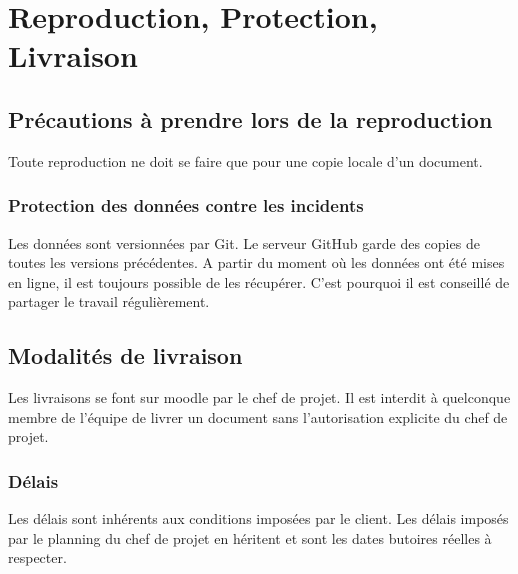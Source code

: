 \section{Reproduction, Protection, Livraison}

\subsection{Précautions à prendre lors de la reproduction}
Toute reproduction ne doit se faire que pour une copie locale d'un document.

\subsubsection{Protection des données contre les incidents}
Les données sont versionnées par Git. Le serveur GitHub garde des copies de toutes les versions précédentes.
A partir du moment où les données ont été mises en ligne, il est toujours possible de les récupérer.
C'est pourquoi il est conseillé de partager le travail régulièrement.

\subsection{Modalités de livraison}
Les livraisons se font sur moodle par le chef de projet.
Il est interdit à quelconque membre de l'équipe de livrer un document sans l'autorisation explicite du chef de projet.

\subsubsection{Délais}
Les délais sont inhérents aux conditions imposées par le client. Les délais imposés par le
planning du chef de projet en héritent et sont les dates butoires réelles à respecter. 

\vfill
\pagebreak
